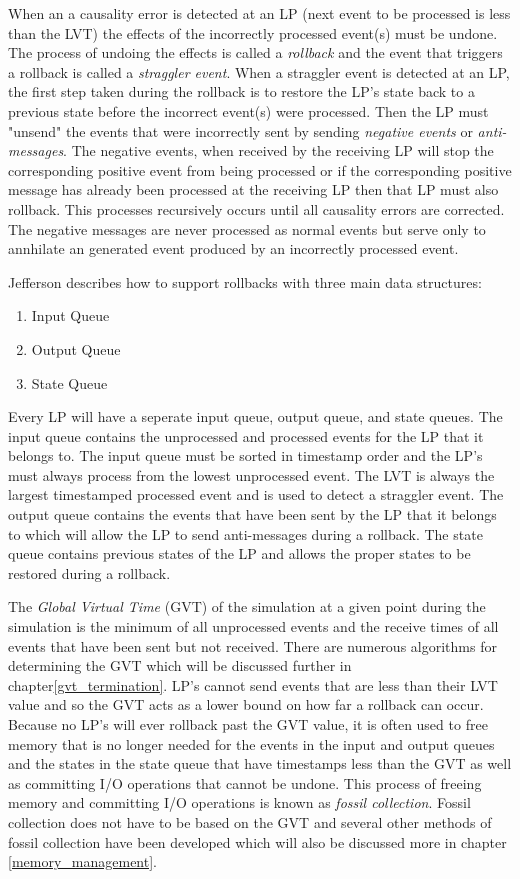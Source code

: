 \documentclass[11pt]{book}
\begin{document}
When an a causality error is detected at an LP (next event to be processed is less than the
LVT) the effects of the incorrectly processed event(s) must be undone. The process
of undoing the effects is called a \emph{rollback} and the event that triggers a rollback
is called a \emph{straggler event}. When a straggler event is detected at an LP, the first
step taken during the rollback is to restore the LP's state back to a previous state before
the incorrect event(s) were processed. Then the LP must "unsend" the events that were
incorrectly sent by sending \emph{negative events} or \emph{anti-messages}. The negative
events, when received by the receiving LP will stop the corresponding positive event from
being processed or if the corresponding positive message has already been processed at
the receiving LP then that LP must also rollback. This processes recursively occurs until
all causality errors are corrected. The negative messages are never processed as normal
events but serve only to annhilate an generated event produced by an incorrectly processed
event.

Jefferson\cite{jefferson-85} describes how to support rollbacks with three main data structures:

\begin{enumerate}
    \item Input Queue
    \item Output Queue
    \item State Queue
\end{enumerate}

\noindent
Every LP will have a seperate input queue, output queue, and state queues. The input
queue contains the unprocessed and processed events for the LP that it belongs to. The
input queue must be sorted in timestamp order and the LP's must always process from the
lowest unprocessed event. The LVT is always the largest timestamped processed event and
is used to detect a straggler event. The output queue contains the events that have been
sent by the LP that it belongs to which will allow the LP to send anti-messages during a
rollback. The state queue contains previous states of the LP and allows the proper states
to be restored during a rollback.

The \emph{Global Virtual Time} (GVT) of the simulation at a given point during the simulation
is the minimum of all unprocessed events and the receive times of all events that have been
sent but not received\cite{jefferson-85}. There are numerous algorithms for determining
the GVT which will be discussed further in chapter\ref{gvt_termination}. LP's cannot send
events that are less than their LVT value and so the GVT acts as a lower bound on how far
a rollback can occur. Because no LP's will ever rollback past the GVT value, it is often
used to free memory that is no longer needed for the events in the input and output queues
and the states in the state queue that have timestamps less than the GVT as well as committing
I/O operations that cannot be undone. This process of freeing memory and committing I/O
operations is known as \emph{fossil collection}. Fossil collection does not have to be based
on the GVT and several other methods of fossil collection have been developed which will
also be discussed more in chapter \ref{memory_management}.
\end{document}
